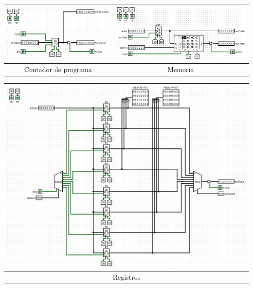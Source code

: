 \documentclass[a4paper,11pt]{article}
\begin{document}
\vspace{0.5cm}

\begin{center}
\begin{tabular}[t]{c|c}
\includegraphics[scale=0.36]{img/2_PC.png} & \includegraphics[scale=1.4]{img/4_Memory.png}\\
\hline
Contador de programa & Memoria\\ \hline
\end{tabular}
\end{center}

\newpage

\begin{center}
\begin{tabular}[t]{c}
\includegraphics[scale=1.35]{img/1_registers.png} \\
\hline
Registros\\ \hline
\end{tabular}
\end{center}
\end{document}
